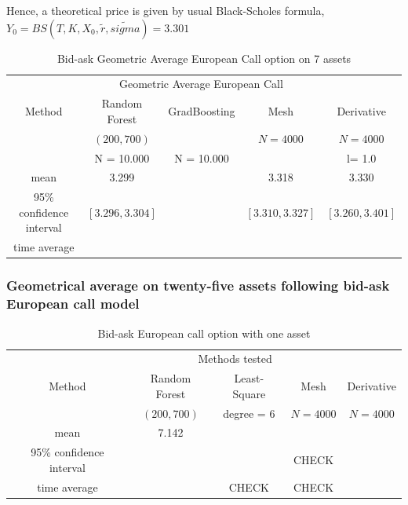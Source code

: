 \documentclass[english,11pt,openany]{article}
\theoremstyle{definition}
\theoremstyle{plain}
\theoremstyle{definition}
\begin{document}
	Hence, a theoretical price is given by usual Black-Scholes formula, $Y_0 = BS(T, K, X_0, \tilde{r}, \tilde{sigma}) = 3.301$
	
	\begin{table}[!h]
		\centering
		\caption{Bid-ask  Geometric Average European Call option on 7 assets}\label{table:call7D}
		\begin{tabular}{*5c}
			\toprule
			& \multicolumn{3}{c}{Geometric Average European Call} \\
			\cmidrule(lr){2-5}
			Method & Random Forest  & GradBoosting & Mesh & Derivative \\    
			& $(200, 700)$ &     & $N = 4 000$ &  $N = 4 000$ \\
			& N = 10.000 & N = 10.000     &  &  l= 1.0\\
			\midrule
			mean &     3.299   &   &  3.318  &  3.330 \\ 
			95\% confidence interval &   $[3.296, 3.304]$     &         & $[3.310, 3.327]$ & $[3.260, 3.401]$  \\
			time average &        &  &  &  \\
			\bottomrule
		\end{tabular}
	\end{table}
	
	\subsubsection{Geometrical average on twenty-five assets following bid-ask European call model}
	
	\begin{table}[H]
		\centering
		\caption{Bid-ask European call option with one asset}\label{table:1}
		\begin{tabular}{*5c}
			\toprule
			& \multicolumn{3}{c}{Methods tested} \\
			\cmidrule(lr){2-4}
			Method & Random Forest  & Least-Square & Mesh & Derivative \\    
			& $(200, 700)$ & degree = $6$     & $N = 4 000$ &  $N = 4 000$ \\
			\midrule
			mean &     7.142   &  &       \\ 
			95\% confidence interval &        &        & CHECK \\
			time average &        & CHECK & CHECK \\
			\bottomrule
		\end{tabular}
	\end{table}
	
\end{document}
